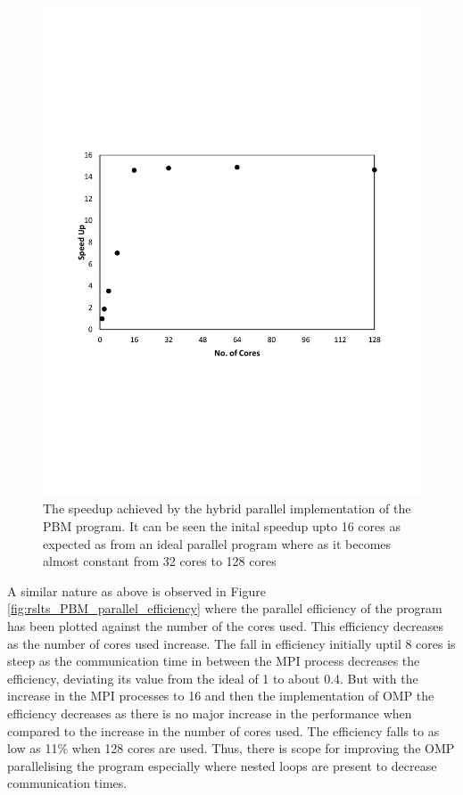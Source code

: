 \documentclass[preprint,11pt,authoryear]{elsarticle}
\begin{document}
\begin{figure}[H]
\centering
\includegraphics[scale=0.7]{rslts_PBM_Speed_Up.pdf}
\caption{The speedup achieved by the hybrid parallel implementation of the PBM program. It can be seen the inital speedup upto 16 cores as expected as from an ideal parallel program where as it becomes almost constant from 32 cores to 128 cores}
\label{fig:rslts_PBM_speed_up}
\end{figure}

A similar nature as above is observed in Figure \ref{fig:rslts_PBM_parallel_efficiency} where the parallel efficiency of the program has been plotted against the number of the cores used. This efficiency decreases as the number of cores used increase. The fall in efficiency initially uptil 8 cores is steep as the communication time in between the MPI process decreases the efficiency, deviating its value from the ideal of 1 to about 0.4. But with the increase in the MPI processes to 16 and then the implementation of OMP the efficiency decreases as there is no major increase in the performance when compared to the increase in the number of cores used. The efficiency falls to as low as 11\% when 128 cores are used. Thus, there is scope for improving the OMP parallelising the program especially where nested loops are present to decrease communication times.
\end{document}

